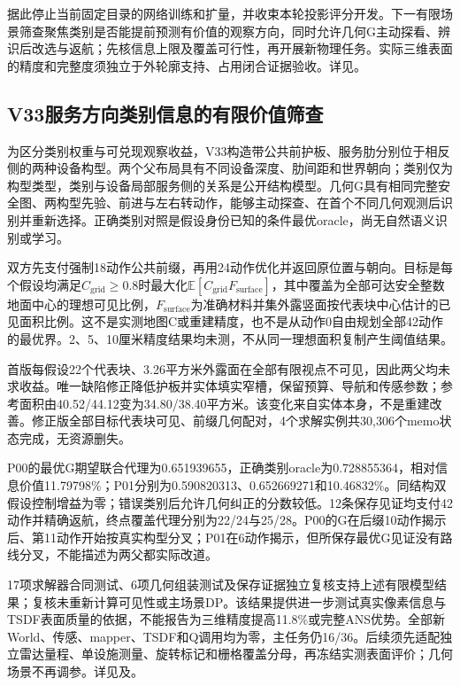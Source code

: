 \documentclass[11pt,a4paper]{article}
\begin{document}
据此停止当前固定目录的网络训练和扩量，并收束本轮投影评分开发。下一有限场景筛查聚焦类别是否能提前预测有价值的观察方向，同时允许几何G主动探看、辨识后改选与返航；先核信息上限及覆盖可行性，再开展新物理任务。实际三维表面的精度和完整度须独立于外轮廓支持、占用闭合证据验收。详见。

\subsection{V33服务方向类别信息的有限价值筛查}

为区分类别权重与可兑现观察收益，V33构造带公共前护板、服务肋分别位于相反侧的两种设备构型。两个父布局具有不同设备深度、肋间距和世界朝向；类别仅为构型类型，类别与设备局部服务侧的关系是公开结构模型。几何G具有相同完整安全图、两构型先验、前进与左右转动作，能够主动探查、在首个不同几何观测后识别并重新选择。正确类别对照是假设身份已知的条件最优oracle，尚无自然语义识别或学习。

双方先支付强制18动作公共前缀，再用24动作优化并返回原位置与朝向。目标是每个假设均满足$C_{\mathrm{grid}}\geq0.8$时最大化$\mathbb{E}[C_{\mathrm{grid}}F_{\mathrm{surface}}]$，其中覆盖为全部可达安全整数地面中心的理想可见比例，$F_{\mathrm{surface}}$为准确材料并集外露竖面按代表块中心估计的已见面积比例。这不是实测地图C或重建精度，也不是从动作0自由规划全部42动作的最优界。2、5、10厘米精度结果均未测，不从同一理想面积复制产生阈值结果。

首版每假设22个代表块、3.26平方米外露面在全部有限视点不可见，因此两父均未求收益。唯一缺陷修正降低护板并实体填实窄槽，保留预算、导航和传感参数；参考面积由40.52/44.12变为34.80/38.40平方米。该变化来自实体本身，不是重建改善。修正版全部目标代表块可见、前缀几何配对，4个求解实例共30,306个memo状态完成，无资源删失。

P00的最优G期望联合代理为0.651939655，正确类别oracle为0.728855364，相对信息价值11.79798\%；P01分别为0.590820313、0.652669271和10.46832\%。同结构双假设控制增益为零；错误类别后允许几何纠正的分数较低。12条保存见证均支付42动作并精确返航，终点覆盖代理分别为22/24与25/28。P00的G在后缀10动作揭示后、第11动作开始按真实构型分叉；P01在6动作揭示，但所保存最优G见证没有路线分叉，不能描述为两父都实际改道。

17项求解器合同测试、6项几何组装测试及保存证据独立复核支持上述有限模型结果；复核未重新计算可见性或主场景DP。该结果提供进一步测试真实像素信息与TSDF表面质量的依据，不能报告为三维精度提高11.8\%或完整ANS优势。全部新World、传感、mapper、TSDF和Q调用均为零，主任务仍16/36。后续须先适配独立雷达量程、单设施测量、旋转标记和栅格覆盖分母，再冻结实测表面评价；几何场景不再调参。详见及。
\end{document}
